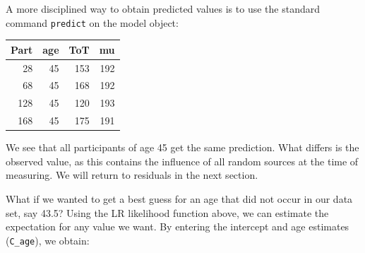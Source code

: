 \documentclass[]{svmono}
\newenvironment{Shaded}{\begin{snugshade}}{\end{snugshade}}
\newcommand{\KeywordTok}[1]{\textcolor[rgb]{0.13,0.29,0.53}{\textbf{#1}}}
\newcommand{\DataTypeTok}[1]{\textcolor[rgb]{0.13,0.29,0.53}{#1}}
\newcommand{\DecValTok}[1]{\textcolor[rgb]{0.00,0.00,0.81}{#1}}
\newcommand{\FloatTok}[1]{\textcolor[rgb]{0.00,0.00,0.81}{#1}}
\newcommand{\StringTok}[1]{\textcolor[rgb]{0.31,0.60,0.02}{#1}}
\newcommand{\OperatorTok}[1]{\textcolor[rgb]{0.81,0.36,0.00}{\textbf{#1}}}
\newcommand{\NormalTok}[1]{#1}
\theoremstyle{definition}
\theoremstyle{definition}
\theoremstyle{definition}
\theoremstyle{remark}
\begin{document}
A more disciplined way to obtain predicted values is to use the standard
command \texttt{predict} on the model object:

\begin{Shaded}
\end{Shaded}

\begin{tabular}{r|r|r|r}
\hline
Part & age & ToT & mu\\
\hline
28 & 45 & 153 & 192\\
\hline
68 & 45 & 168 & 192\\
\hline
128 & 45 & 120 & 193\\
\hline
168 & 45 & 175 & 191\\
\hline
\end{tabular}

We see that all participants of age 45 get the same prediction. What
differs is the observed value, as this contains the influence of all
random sources at the time of measuring. We will return to residuals in
the next section.

What if we wanted to get a best guess for an age that did not occur in
our data set, say 43.5? Using the LR likelihood function above, we can
estimate the expectation for any value we want. By entering the
intercept and age estimates (\texttt{C\_age}), we obtain:

\begin{Shaded}
\end{Shaded}
\end{document}
